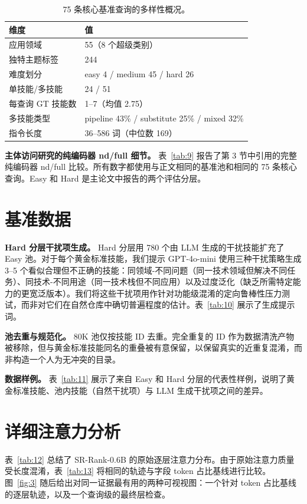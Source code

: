\documentclass[11pt,UTF8,fontset=fandol]{ctexart}
\begin{document}
\begin{table}[H]\centering
\caption{75 条核心基准查询的多样性概况。}
\begin{tabular}{ll}
\toprule
维度 & 值 \\ \midrule
应用领域 & 55（8 个超级类别） \\
独特主题标签 & 244 \\
难度划分 & easy 4 / medium 45 / hard 26 \\
单技能/多技能 & 24 / 51 \\
每查询 GT 技能数 & 1--7（均值 2.75） \\
多技能类型 & pipeline 43\% / substitute 25\% / mixed 32\% \\
指令长度 & 36--586 词（中位数 169） \\
\bottomrule
\end{tabular}
\label{tab:8}
\end{table}

\textbf{主体访问研究的纯编码器 nd/full 细节。} 表~\ref{tab:9} 报告了第 3 节中引用的完整纯编码器 nd/full 比较。所有数字都使用与正文相同的基准池和相同的 75 条核心查询。Easy 和 Hard 是主论文中报告的两个评估分层。

\section{基准数据}

\textbf{Hard 分层干扰项生成。} Hard 分层用 780 个由 LLM 生成的干扰技能扩充了 Easy 池。对于每个黄金标准技能，我们提示 GPT-4o-mini 使用三种干扰策略生成 3--5 个看似合理但不正确的技能：同领域-不同问题（同一技术领域但解决不同任务）、同技术-不同用途（同一技术栈但不同应用）以及过度泛化（缺乏所需特定能力的更宽泛版本）。我们将这些干扰项用作针对功能级混淆的定向鲁棒性压力测试，而非对它们在自然仓库中确切普遍程度的估计。表~\ref{tab:10} 展示了生成提示词。

\textbf{池去重与规范化。} 80K 池仅按技能 ID 去重。完全重复的 ID 作为数据清洗产物被移除，但与黄金标准技能同名的重叠被有意保留，以保留真实的近重复混淆，而非构造一个人为无冲突的目录。

\textbf{数据样例。} 表~\ref{tab:11} 展示了来自 Easy 和 Hard 分层的代表性样例，说明了黄金标准技能、池内技能（自然干扰项）与 LLM 生成干扰项之间的差异。

\section{详细注意力分析}

表~\ref{tab:12} 总结了 SR-Rank-0.6B 的原始逐层注意力分布。由于原始注意力质量受长度混淆，表~\ref{tab:13} 将相同的轨迹与字段 token 占比基线进行比较。图~\ref{fig:3} 随后给出对同一证据最有用的两种可视视图：一个针对 token 占比基线的逐层轨迹，以及一个查询级的最终层检查。
\end{document}
